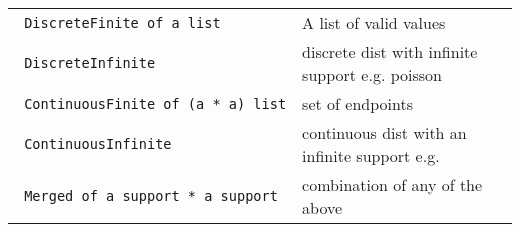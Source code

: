 \begin{longtable}[c]{@{}ll@{}}
\toprule
\begin{minipage}[t]{0.47\columnwidth}\raggedright\strut
\protect\hyperlink{type-support.DiscreteFinite}{}\texttt{\textbar{}\ }\texttt{DiscreteFinite\ of\ \textquotesingle{}a\ list}
\strut\end{minipage} &
\begin{minipage}[t]{0.47\columnwidth}\raggedright\strut
A list of valid values
\strut\end{minipage}\tabularnewline
\begin{minipage}[t]{0.47\columnwidth}\raggedright\strut
\protect\hyperlink{type-support.DiscreteInfinite}{}\texttt{\textbar{}\ }\texttt{DiscreteInfinite}
\strut\end{minipage} &
\begin{minipage}[t]{0.47\columnwidth}\raggedright\strut
discrete dist with infinite support e.g. poisson
\strut\end{minipage}\tabularnewline
\begin{minipage}[t]{0.47\columnwidth}\raggedright\strut
\protect\hyperlink{type-support.ContinuousFinite}{}\texttt{\textbar{}\ }\texttt{ContinuousFinite\ of\ (\textquotesingle{}a\ *\ \textquotesingle{}a)\ list}
\strut\end{minipage} &
\begin{minipage}[t]{0.47\columnwidth}\raggedright\strut
set of endpoints
\strut\end{minipage}\tabularnewline
\begin{minipage}[t]{0.47\columnwidth}\raggedright\strut
\protect\hyperlink{type-support.ContinuousInfinite}{}\texttt{\textbar{}\ }\texttt{ContinuousInfinite}
\strut\end{minipage} &
\begin{minipage}[t]{0.47\columnwidth}\raggedright\strut
continuous dist with an infinite support e.g.
\strut\end{minipage}\tabularnewline
\begin{minipage}[t]{0.47\columnwidth}\raggedright\strut
\protect\hyperlink{type-support.Merged}{}\texttt{\textbar{}\ }\texttt{Merged\ of\ \textquotesingle{}a\ support\ *\ \textquotesingle{}a\ support}
\strut\end{minipage} &
\begin{minipage}[t]{0.47\columnwidth}\raggedright\strut
combination of any of the above
\strut\end{minipage}\tabularnewline
\bottomrule
\end{longtable}

